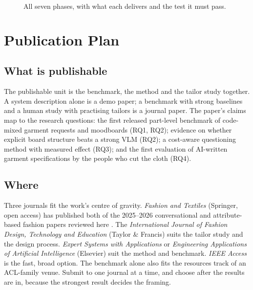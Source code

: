 \begin{landscape}
\begin{figure}[p]
\centering
\caption{All seven phases, with what each delivers and the test it must pass.}\label{fig:roadmap}
\end{figure}
\end{landscape}

\chapter{Publication Plan}\label{ch:pub}

\section{What is publishable}

The publishable unit is the benchmark, the method and the tailor study together. A system description alone is a demo paper; a benchmark with strong baselines and a human study with practising tailors is a journal paper. The paper's claims map to the research questions: the first released part-level benchmark of code-mixed garment requests and moodboards (RQ1, RQ2); evidence on whether explicit board structure beats a strong VLM (RQ2); a cost-aware questioning method with measured effect (RQ3); and the first evaluation of AI-written garment specifications by the people who cut the cloth (RQ4).

\section{Where}

Three journals fit the work's centre of gravity. \emph{Fashion and Textiles} (Springer, open access) has published both of the 2025--2026 conversational and attribute-based fashion papers reviewed here \cite{park2025fea,khleborodova2026}. The \emph{International Journal of Fashion Design, Technology and Education} (Taylor \& Francis) suits the tailor study and the design process. \emph{Expert Systems with Applications} or \emph{Engineering Applications of Artificial Intelligence} (Elsevier) suit the method and benchmark. \emph{IEEE Access} is the fast, broad option. The benchmark alone also fits the resources track of an ACL-family venue. Submit to one journal at a time, and choose after the results are in, because the strongest result decides the framing.

